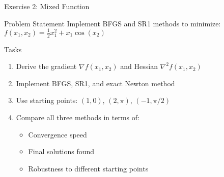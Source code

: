 \documentclass[aspectratio=1610]{beamer}
\begin{document}
\begin{frame}{Exercise 2: Mixed Function}
  \begin{block}{Problem Statement}
    Implement BFGS and SR1 methods to minimize:
    $f(x_1, x_2) = \frac{1}{2}x_1^2 + x_1\cos(x_2)$
  \end{block}
  
  \vspace{0.5cm}
  \begin{block}{Tasks}
    \begin{enumerate}
      \item Derive the gradient $\nabla f(x_1, x_2)$ and Hessian $\nabla^2 f(x_1, x_2)$
      \item Implement BFGS, SR1, and exact Newton method
      \item Use starting points: $(1, 0)$, $(2, \pi)$, $(-1, \pi/2)$
      \item Compare all three methods in terms of:
      \begin{itemize}
        \item Convergence speed
        \item Final solutions found
        \item Robustness to different starting points
      \end{itemize}
    \end{enumerate}
  \end{block}
\end{frame}
\end{document}

